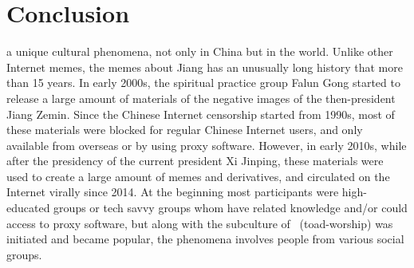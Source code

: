 \chapter{Conclusion}

 a unique cultural phenomena, not only in China but in the world. Unlike other Internet memes, the memes about Jiang has an unusually long history that more than 15 years. In early 2000s, the spiritual practice group Falun Gong started to release a large amount of materials of the negative images of the then-president Jiang Zemin. Since the Chinese Internet censorship started from 1990s, most of these materials were blocked for regular Chinese Internet users, and only available from overseas or by using proxy software. However, in early 2010s, while after the presidency of the current president Xi Jinping, these materials were used to create a large amount of memes and derivatives, and circulated on the Internet virally since 2014. At the beginning most participants were high-educated groups or tech savvy groups whom have related knowledge and/or could access to proxy software, but along with the subculture of \moha\ (toad-worship) was initiated and became popular, the phenomena involves people from various social groups.

